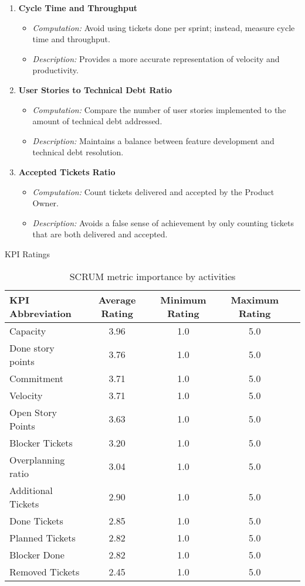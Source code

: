 \begin{enumerate}
    \item \textbf{Cycle Time and Throughput}
    \begin{itemize}
        \item \textit{Computation:} Avoid using tickets done per sprint; instead, measure cycle time and throughput.
        \item \textit{Description:} Provides a more accurate representation of velocity and productivity.
    \end{itemize}

    \item \textbf{User Stories to Technical Debt Ratio}
    \begin{itemize}
        \item \textit{Computation:} Compare the number of user stories implemented to the amount of technical debt addressed.
        \item \textit{Description:} Maintains a balance between feature development and technical debt resolution.
    \end{itemize}

    \item \textbf{Accepted Tickets Ratio}
    \begin{itemize}
        \item \textit{Computation:} Count tickets delivered and accepted by the Product Owner.
        \item \textit{Description:} Avoids a false sense of achievement by only counting tickets that are both delivered and accepted.
    \end{itemize}
\end{enumerate}


\begin{table}[!h]
    \centering
    \caption{KPI Ratings}
    \begin{tabular}{lcccc}
        \toprule
        KPI Abbreviation & Average Rating & Minimum Rating & Maximum Rating \\
        \midrule
        Capacity & 3.96 & 1.0 & 5.0 \\
        Done story points & 3.76 & 1.0 & 5.0 \\
        Commitment & 3.71 & 1.0 & 5.0 \\
        Velocity & 3.71 & 1.0 & 5.0 \\
        Open Story Points & 3.63 & 1.0 & 5.0 \\
        Blocker Tickets & 3.20 & 1.0 & 5.0 \\
        Overplanning ratio & 3.04 & 1.0 & 5.0 \\
        Additional Tickets & 2.90 & 1.0 & 5.0 \\
        Done Tickets & 2.85 & 1.0 & 5.0 \\
        Planned Tickets & 2.82 & 1.0 & 5.0 \\
        Blocker Done & 2.82 & 1.0 & 5.0 \\
        Removed Tickets & 2.45 & 1.0 & 5.0 \\
    \end{tabular}
    \decoRule
    \caption[SCRUM metric importance by activities]{SCRUM metric importance by activities}
    \label{tab:kpi_ratings}
\end{table}

